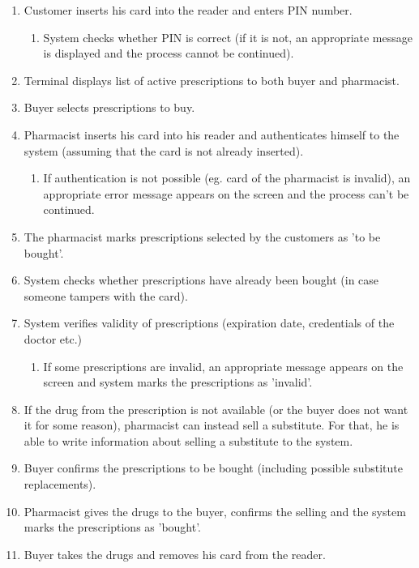 \begin{enumerate}
  \item Customer inserts his card into the reader and enters PIN number.
  \begin{enumerate}
	\item System checks whether PIN is correct (if it is not, an appropriate message is displayed and the process cannot be continued).
  \end{enumerate}
  \item Terminal displays list of active prescriptions to both buyer and pharmacist.
  \item Buyer selects prescriptions to buy.
  \item Pharmacist inserts his card into his reader and authenticates himself to the system (assuming that the card is not already inserted).
  \begin{enumerate}
	\item  If authentication is not possible (eg. card of the pharmacist is invalid), an appropriate error message appears on the screen and the process can't be continued.
  \end{enumerate}
  \item The pharmacist marks prescriptions selected by the customers as 'to be bought'.
  \item System checks whether prescriptions have already been bought (in case someone tampers with the card).
  \item System verifies validity of prescriptions (expiration date, credentials of the doctor etc.)
 \begin{enumerate}
	\item If some prescriptions are invalid, an appropriate message appears on the screen and system marks the prescriptions as 'invalid'.
  \end{enumerate}
  \item  If the drug from the prescription is not available (or the buyer does not want it for some reason), pharmacist can instead sell a substitute. For that, he is able to write information about selling a substitute to the system.
  \item Buyer confirms the prescriptions to be bought (including possible substitute replacements).
  \item Pharmacist gives the drugs to the buyer, confirms the selling and the system marks the prescriptions as 'bought'.
  \item  Buyer takes the drugs and removes his card from the reader.
\end{enumerate}

